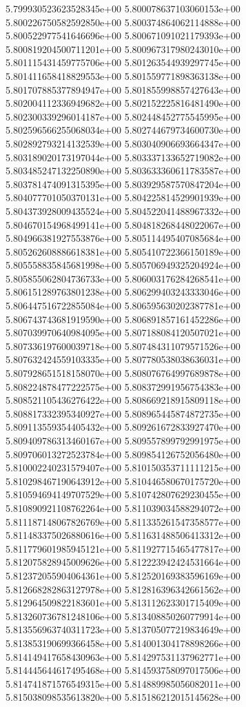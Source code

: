 5.799930523623528345e+00
5.800078637103060153e+00
5.800226750582592850e+00
5.800374864062114888e+00
5.800522977541646696e+00
5.800671091021179393e+00
5.800819204500711201e+00
5.800967317980243010e+00
5.801115431459775706e+00
5.801263544939297745e+00
5.801411658418829553e+00
5.801559771898363138e+00
5.801707885377894947e+00
5.801855998857427643e+00
5.802004112336949682e+00
5.802152225816481490e+00
5.802300339296014187e+00
5.802448452775545995e+00
5.802596566255068034e+00
5.802744679734600730e+00
5.802892793214132539e+00
5.803040906693664347e+00
5.803189020173197044e+00
5.803337133652719082e+00
5.803485247132250890e+00
5.803633360611783587e+00
5.803781474091315395e+00
5.803929587570847204e+00
5.804077701050370131e+00
5.804225814529901939e+00
5.804373928009435524e+00
5.804522041488967332e+00
5.804670154968499141e+00
5.804818268448022067e+00
5.804966381927553876e+00
5.805114495407085684e+00
5.805262608886618381e+00
5.805410722366150189e+00
5.805558835845681998e+00
5.805706949325204924e+00
5.805855062804736733e+00
5.806003176284268541e+00
5.806151289763801238e+00
5.806299403243333046e+00
5.806447516722855084e+00
5.806595630202387781e+00
5.806743743681919590e+00
5.806891857161452286e+00
5.807039970640984095e+00
5.807188084120507021e+00
5.807336197600039718e+00
5.807484311079571526e+00
5.807632424559103335e+00
5.807780538038636031e+00
5.807928651518158070e+00
5.808076764997689878e+00
5.808224878477222575e+00
5.808372991956754383e+00
5.808521105436276422e+00
5.808669218915809118e+00
5.808817332395340927e+00
5.808965445874872735e+00
5.809113559354405432e+00
5.809261672833927470e+00
5.809409786313460167e+00
5.809557899792991975e+00
5.809706013272523784e+00
5.809854126752056480e+00
5.810002240231579407e+00
5.810150353711111215e+00
5.810298467190643912e+00
5.810446580670175720e+00
5.810594694149707529e+00
5.810742807629230455e+00
5.810890921108762264e+00
5.811039034588294072e+00
5.811187148067826769e+00
5.811335261547358577e+00
5.811483375026880616e+00
5.811631488506413312e+00
5.811779601985945121e+00
5.811927715465477817e+00
5.812075828945009626e+00
5.812223942424531664e+00
5.812372055904064361e+00
5.812520169383596169e+00
5.812668282863127978e+00
5.812816396342661562e+00
5.812964509822183601e+00
5.813112623301715409e+00
5.813260736781248106e+00
5.813408850260779914e+00
5.813556963740311723e+00
5.813705077219834649e+00
5.813853190699366458e+00
5.814001304178898266e+00
5.814149417658430963e+00
5.814297531137962771e+00
5.814445644617495468e+00
5.814593758097017506e+00
5.814741871576549315e+00
5.814889985056082011e+00
5.815038098535613820e+00
5.815186212015145628e+00
